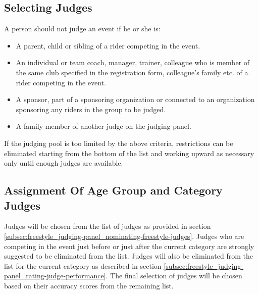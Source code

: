 \subsection{Selecting Judges \label{subsec:freestyle_judging-panel_selecting-judges}}
A person should not judge an event if he or she is:
\begin{itemize}
\item A parent, child or sibling of a rider competing in the event.
\item An individual or team coach, manager, trainer, colleague who is member of the same club specified in the registration form, colleague's family etc.
of a rider competing in the event.
\item A sponsor, part of a sponsoring organization or connected to an organization sponsoring any riders in the group to be judged.
\item A family member of another judge on the judging panel.
\end{itemize}
If the judging pool is too limited by the above criteria, restrictions can be eliminated starting from the bottom of the list and working upward as necessary only until enough judges are available.

\subsection{Assignment Of Age Group and Category Judges}
Judges will be chosen from the list of judges as provided in section \ref{subsec:freestyle_judging-panel_nominating-freestyle-judges}.
Judges who are competing in the event just before or just after the current category are strongly suggested to be eliminated from the list.
Judges will also be eliminated from the list for the current category as described in section \ref{subsec:freestyle_judging-panel_rating-judge-performance}.
The final selection of judges will be chosen based on their accuracy scores from the remaining list.%

